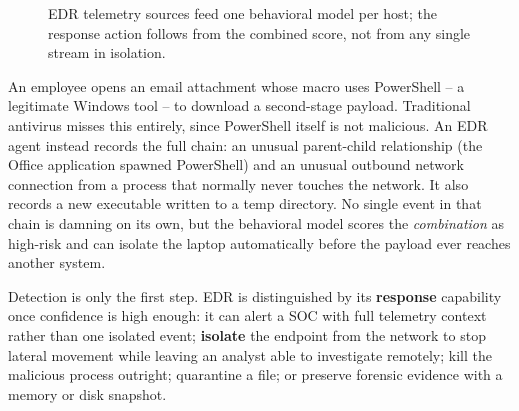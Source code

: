\begin{figure}[h]
\centering
{}
\caption{EDR telemetry sources feed one behavioral model per host; the response action follows from
the combined score, not from any single stream in isolation.}
\label{fig:4.4-edr-telemetry}
\end{figure}

\begin{example}
An employee opens an email attachment whose macro uses PowerShell -- a legitimate Windows tool --
to download a second-stage payload. Traditional antivirus misses this entirely, since PowerShell
itself is not malicious. An EDR agent instead records the full chain: an unusual parent-child
relationship (the Office application spawned PowerShell) and an unusual outbound network connection
from a process that normally never touches the network. It also records a new executable written to
a temp directory. No single event in that chain is damning on its own, but the behavioral model scores the
\emph{combination} as high-risk and can isolate the laptop automatically before the payload ever
reaches another system.
\end{example}

Detection is only the first step. EDR is distinguished by its \textbf{response} capability once
confidence is high enough: it can alert a SOC with full telemetry context rather than one isolated
event; \textbf{isolate} the endpoint from the network to stop lateral movement while leaving an
analyst able to investigate remotely; kill the malicious process outright; quarantine a file; or
preserve forensic evidence with a memory or disk snapshot.


